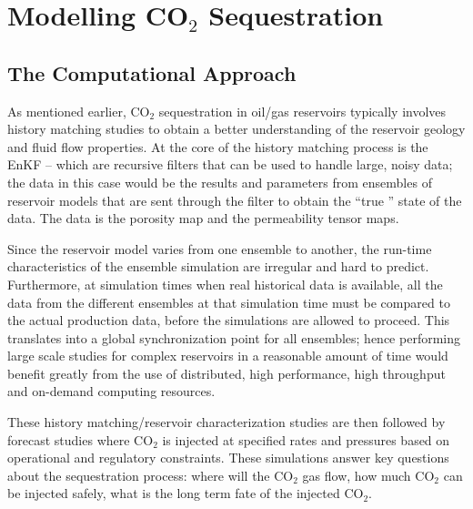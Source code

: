 \documentclass{rspublic}
\newcommand{\up}{\vspace*{-0.3em}}
\newcommand{\jhanote}[1]{ {\textcolor{red} { ***Jha: #1 }}}
\newcommand{\yyenote}[1]{ {\textcolor{blue} { ***yye00: #1 }}}
\newcommand{\jhanote}[1]{}
\newcommand{\yyenote}[1]{}
\begin{document}
\up\up
\section{Modelling CO$_2$ Sequestration}


\up
\subsection{The Computational Approach}
\up
As mentioned earlier, CO$_2$ sequestration in oil/gas reservoirs
typically involves history matching studies to obtain a better
understanding of the reservoir geology and fluid flow properties.
At the core of the history matching process is the EnKF -- 
which are recursive filters that can be used to
handle large, noisy data; the data in this case would be the results
and parameters from ensembles of reservoir models that are sent
through the filter to obtain the ``true '' state of the data.
The data is the porosity map and the permeability tensor maps.

Since the reservoir model varies from one ensemble to another, the
run-time characteristics of the ensemble simulation are irregular and
hard to predict. Furthermore, at simulation times when real historical
data is available, all the data from the different ensembles at that
simulation time must be compared to the actual production data, before
the simulations are allowed to proceed. This translates into a global
synchronization point for all ensembles; hence performing large scale
studies for complex reservoirs in a reasonable amount of time would
benefit greatly from the use of distributed, high performance, high
throughput and on-demand computing resources.

These history matching/reservoir characterization studies are then
followed by forecast studies where CO$_2$ is injected at specified
rates and pressures based on operational and regulatory constraints.
These simulations answer key questions about the sequestration
process: where will the CO$_2$ gas flow, how much CO$_2$ can be
injected safely, what is the long term fate of the injected CO$_2$.
\end{document}
